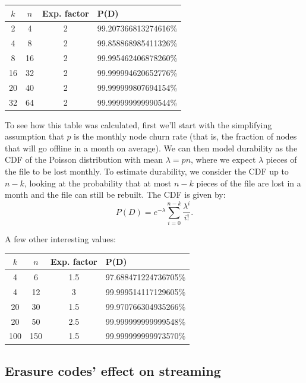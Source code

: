 \documentclass[11pt,fleqn,openany]{book}
\begin{document}
\begin{center}
\begin{tabular}{c c c l}
$k$ & $n$ & Exp. factor & P(D) \\ \hline
2 & 4 & 2 & 99.207366813274616\%\\
4 & 8 & 2 & 99.858868985411326\%\\
8 & 16 & 2 & 99.995462406878260\%\\
16 & 32 & 2 & 99.999994620652776\%\\
20 & 40 & 2 & 99.999999807694154\%\\
32 & 64 & 2 & 99.999999999990544\%\\
\end{tabular}
\end{center}

To see how this table was calculated, first we'll start
with the simplifying assumption that $p$ is the monthly node
churn rate (that is, the fraction of nodes that will go offline in a month on
average). We can then model durability
as the CDF of the Poisson distribution with mean $\lambda=pn$,
where we expect $\lambda$ pieces of the file to be lost monthly. To estimate
durability, we consider the CDF up to $n-k$,
looking at the probability that at most $n-k$ pieces
of the file are lost in a month and the file can still be rebuilt.
The CDF is given by:
\begin{equation}
P(D) = e^{-\lambda} \sum_{i=0}^{n-k} \frac{\lambda^i}{i!}.
\label{eq:poiss_cdf}
\end{equation}

A few other interesting values:

\begin{center}
\begin{tabular}{c c c l}
$k$ & $n$ & Exp. factor & P(D) \\ \hline
4 & 6 & 1.5 & 97.688471224736705\%\\
4 & 12 & 3 & 99.999514117129605\%\\
20 & 30 & 1.5 & 99.970766304935266\%\\
20 & 50 & 2.5 & 99.999999999999548\%\\
100 & 150 & 1.5 & 99.999999999973570\%\\
\end{tabular}
\end{center}

\subsection{Erasure codes' effect on streaming}
\end{document}
